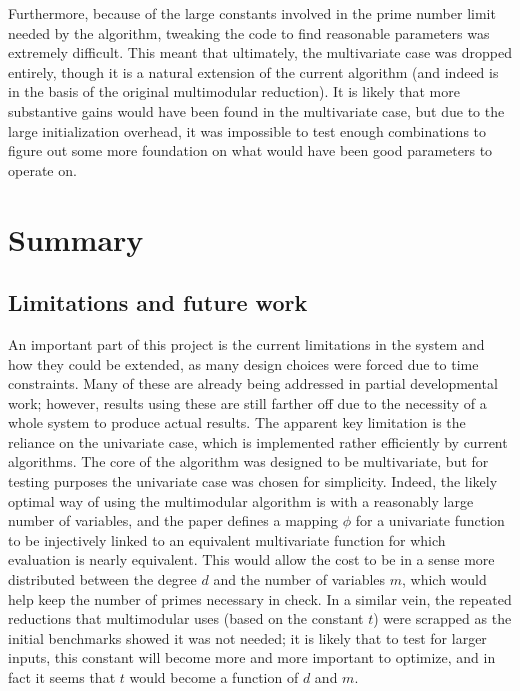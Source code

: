 \documentclass[pageno]{jpaper}
\begin{document}
Furthermore, because of the large constants involved in the prime number limit needed by the algorithm, tweaking the code to find reasonable parameters was extremely difficult.
This meant that ultimately, the multivariate case was dropped entirely, though it is a natural extension of the current algorithm (and indeed is in the basis of the original multimodular reduction).
It is likely that more substantive gains would have been found in the multivariate case, but due to the large initialization overhead, it was impossible to test enough combinations to figure out some more foundation on what would have been good parameters to operate on.

\section{Summary}

\subsection{Limitations and future work}
An important part of this project is the current limitations in the system and how they could be extended, as many design choices were forced due to time constraints.
Many of these are already being addressed in partial developmental work; however, results using these are still farther off due to the necessity of a whole system to produce actual results.
The apparent key limitation is the reliance on the univariate case, which is implemented rather efficiently by current algorithms.
The core of the algorithm was designed to be multivariate, but for testing purposes the univariate case was chosen for simplicity.
Indeed, the likely optimal way of using the multimodular algorithm is with a reasonably large number of variables, and the paper defines a mapping $\phi$ for a univariate function to be injectively linked to an equivalent multivariate function for which evaluation is nearly equivalent.
This would allow the cost to be in a sense more distributed between the degree $d$ and the number of variables $m$, which would help keep the number of primes necessary in check.
In a similar vein, the repeated reductions that multimodular uses (based on the constant $t$) were scrapped as the initial benchmarks showed it was not needed; it is likely that to test for larger inputs, this constant will become more and more important to optimize, and in fact it seems that $t$ would become a function of $d$ and $m$.
\end{document}
